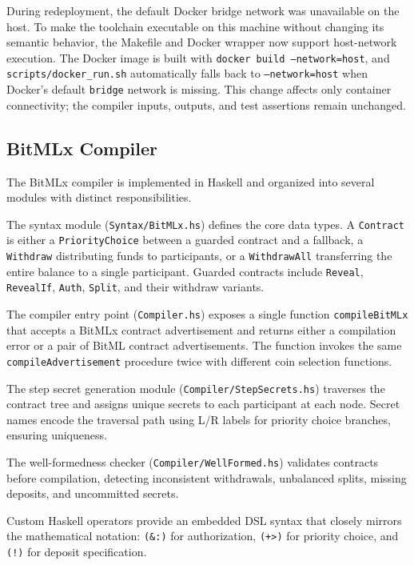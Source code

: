 \documentclass[journal]{IEEEtran}
\begin{document}
During redeployment, the default Docker bridge network was unavailable on the host. To make the toolchain executable on this machine without changing its semantic behavior, the Makefile and Docker wrapper now support host-network execution. The Docker image is built with \texttt{docker build --network=host}, and \texttt{scripts/docker\_run.sh} automatically falls back to \texttt{--network=host} when Docker's default \texttt{bridge} network is missing. This change affects only container connectivity; the compiler inputs, outputs, and test assertions remain unchanged.

\subsection{BitMLx Compiler}

The BitMLx compiler is implemented in Haskell and organized into several modules with distinct responsibilities.

The syntax module (\texttt{Syntax/BitMLx.hs}) defines the core data types. A \texttt{Contract} is either a \texttt{PriorityChoice} between a guarded contract and a fallback, a \texttt{Withdraw} distributing funds to participants, or a \texttt{WithdrawAll} transferring the entire balance to a single participant. Guarded contracts include \texttt{Reveal}, \texttt{RevealIf}, \texttt{Auth}, \texttt{Split}, and their withdraw variants.

The compiler entry point (\texttt{Compiler.hs}) exposes a single function \texttt{compileBitMLx} that accepts a BitMLx contract advertisement and returns either a compilation error or a pair of BitML contract advertisements. The function invokes the same \texttt{compileAdvertisement} procedure twice with different coin selection functions.

The step secret generation module (\texttt{Compiler/StepSecrets.hs}) traverses the contract tree and assigns unique secrets to each participant at each node. Secret names encode the traversal path using L/R labels for priority choice branches, ensuring uniqueness.

The well-formedness checker (\texttt{Compiler/WellFormed.hs}) validates contracts before compilation, detecting inconsistent withdrawals, unbalanced splits, missing deposits, and uncommitted secrets.

Custom Haskell operators provide an embedded DSL syntax that closely mirrors the mathematical notation: \texttt{(\&:)} for authorization, \texttt{(+>)} for priority choice, and \texttt{(!)} for deposit specification.
\end{document}
